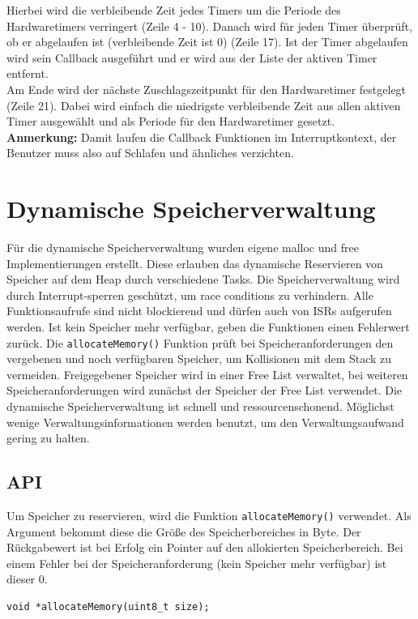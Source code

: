 \documentclass[fontsize=12pt, toc=bibliography, notitlepage]{scrreprt}
\begin{document}
Hierbei wird die verbleibende Zeit jedes Timers um die Periode des Hardwaretimers verringert (Zeile 4 - 10). Danach wird für jeden Timer überprüft, ob er abgelaufen ist (verbleibende Zeit ist 0) (Zeile 17). Ist der Timer abgelaufen wird sein Callback ausgeführt und er wird aus der Liste der aktiven Timer entfernt.\\
Am Ende wird der nächste Zuschlagszeitpunkt für den Hardwaretimer festgelegt (Zeile 21). Dabei wird einfach die niedrigste verbleibende Zeit aus allen aktiven Timer ausgewählt und als Periode für den Hardwaretimer gesetzt.\\
\textbf{Anmerkung:} Damit laufen die Callback Funktionen im Interruptkontext, der Benutzer muss also auf Schlafen und ähnliches verzichten.

\chapter{Dynamische Speicherverwaltung}
\label{chap:dynamische-speicherverwaltung}
Für die dynamische Speicherverwaltung wurden eigene malloc und free Implementierungen erstellt. Diese erlauben das dynamische Reservieren von Speicher auf dem Heap durch verschiedene Tasks. Die Speicherverwaltung wird durch Interrupt-sperren geschützt, um race conditions zu verhindern. Alle Funktionsaufrufe sind nicht blockierend und dürfen auch von ISRs aufgerufen werden. Ist kein Speicher mehr verfügbar, geben die Funktionen einen Fehlerwert zurück. Die \lstinline$allocateMemory()$ Funktion prüft bei Speicheranforderungen den vergebenen und noch verfügbaren Speicher, um Kollisionen mit dem Stack zu vermeiden. Freigegebener Speicher wird in einer Free List verwaltet, bei weiteren Speicheranforderungen wird zunächst der Speicher der Free List verwendet. Die dynamische Speicherverwaltung ist schnell und ressourcenschonend. Möglichst wenige Verwaltungsinformationen werden benutzt, um den Verwaltungsaufwand gering zu halten. 

\section{API}
\label{subsec:mem-api}
Um Speicher zu reservieren, wird die Funktion \lstinline$allocateMemory()$ verwendet. Als Argument bekommt diese die Größe des Speicherbereiches in Byte. Der Rückgabewert ist bei Erfolg ein Pointer auf den allokierten Speicherbereich. Bei einem Fehler bei der Speicheranforderung (kein Speicher mehr verfügbar) ist dieser 0.

\begin{lstlisting}[title=memory.h]
void *allocateMemory(uint8_t size);
\end{lstlisting}
\end{document}

